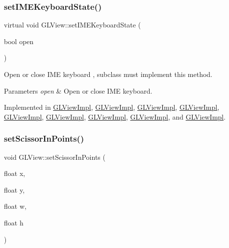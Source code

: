 \subsubsection{\texorpdfstring{set\+I\+M\+E\+Keyboard\+State()}{setIMEKeyboardState()}\hspace{0.1cm}{\footnotesize\ttfamily [2/2]}}
{\footnotesize\ttfamily virtual void G\+L\+View\+::set\+I\+M\+E\+Keyboard\+State (\begin{DoxyParamCaption}\item[{bool}]{open }\end{DoxyParamCaption})\hspace{0.3cm}{\ttfamily [pure virtual]}}

Open or close I\+ME keyboard , subclass must implement this method.


\begin{DoxyParams}{Parameters}
{\em open} & Open or close I\+ME keyboard. \\
\hline
\end{DoxyParams}


Implemented in \hyperlink{classGLViewImpl_a97c906321e44204249b112de5706a617}{G\+L\+View\+Impl}, \hyperlink{classGLViewImpl_a37e04acaf52f6258ebe98d6b36c3b6c3}{G\+L\+View\+Impl}, \hyperlink{classGLViewImpl_a37e04acaf52f6258ebe98d6b36c3b6c3}{G\+L\+View\+Impl}, \hyperlink{classGLViewImpl_a37e04acaf52f6258ebe98d6b36c3b6c3}{G\+L\+View\+Impl}, \hyperlink{classGLViewImpl_a37e04acaf52f6258ebe98d6b36c3b6c3}{G\+L\+View\+Impl}, \hyperlink{classGLViewImpl_a37e04acaf52f6258ebe98d6b36c3b6c3}{G\+L\+View\+Impl}, \hyperlink{classGLViewImpl_a134389b64b11ebd0af740c9acba58dc9}{G\+L\+View\+Impl}, \hyperlink{classGLViewImpl_a134389b64b11ebd0af740c9acba58dc9}{G\+L\+View\+Impl}, and \hyperlink{classGLViewImpl_a134389b64b11ebd0af740c9acba58dc9}{G\+L\+View\+Impl}.

\mbox{\label{classGLView_a92dd9d0d58e97aeb5cb236f8155b9040}} 
\subsubsection{\texorpdfstring{set\+Scissor\+In\+Points()}{setScissorInPoints()}\hspace{0.1cm}{\footnotesize\ttfamily [1/2]}}
{\footnotesize\ttfamily void G\+L\+View\+::set\+Scissor\+In\+Points (\begin{DoxyParamCaption}\item[{float}]{x,  }\item[{float}]{y,  }\item[{float}]{w,  }\item[{float}]{h }\end{DoxyParamCaption})\hspace{0.3cm}{\ttfamily [virtual]}}


